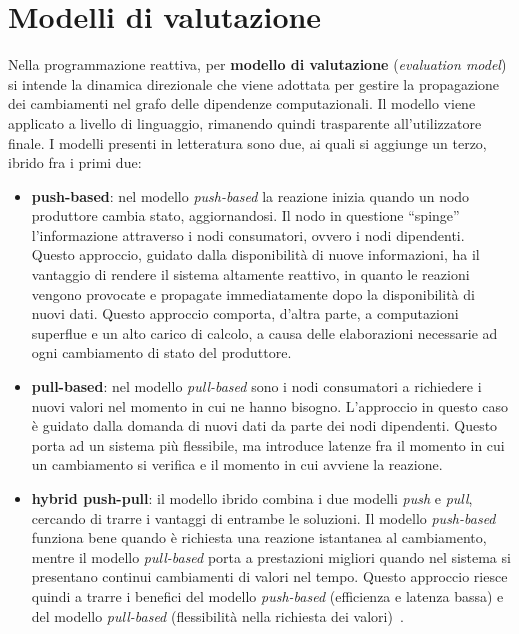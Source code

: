 \documentclass[12pt,a4paper,openright,twoside]{book}
\begin{document}
\section{Modelli di valutazione}
Nella programmazione reattiva, per \textbf{modello di valutazione} (\textit{evaluation model}) si intende la dinamica direzionale che viene adottata per gestire la propagazione dei cambiamenti nel grafo delle dipendenze computazionali. 
Il modello viene applicato a livello di linguaggio, rimanendo quindi trasparente all'utilizzatore finale. 
I modelli presenti in letteratura sono due, ai quali si aggiunge un terzo, ibrido fra i primi due: 
\begin{itemize}
    \item \textbf{push-based}: nel modello \textit{push-based} la reazione inizia quando un nodo produttore cambia stato, aggiornandosi. Il nodo in questione ``spinge'' l'informazione attraverso i nodi consumatori, ovvero i nodi dipendenti. Questo approccio, guidato dalla disponibilità di nuove informazioni, ha il vantaggio di rendere il sistema altamente reattivo, in quanto le reazioni vengono provocate e propagate immediatamente dopo la disponibilità di nuovi dati. Questo approccio comporta, d'altra parte, a computazioni superflue e un alto carico di calcolo, a causa delle elaborazioni necessarie ad ogni cambiamento di stato del produttore. 
    \item \textbf{pull-based}: nel modello \textit{pull-based} sono i nodi consumatori a richiedere i nuovi valori nel momento in cui ne hanno bisogno. L'approccio in questo caso è guidato dalla domanda di nuovi dati da parte dei nodi dipendenti. Questo porta ad un sistema più flessibile, ma introduce latenze fra il momento in cui un cambiamento si verifica e il momento in cui avviene la reazione. 
    \item \textbf{hybrid push-pull}: il modello ibrido combina i due modelli \textit{push} e \textit{pull}, cercando di trarre i vantaggi di entrambe le soluzioni. Il modello \textit{push-based} funziona bene quando è richiesta una reazione istantanea al cambiamento, mentre il modello \textit{pull-based} porta a prestazioni migliori quando nel sistema si presentano continui cambiamenti di valori nel tempo. Questo approccio riesce quindi a trarre i benefici del modello \textit{push-based} (efficienza e latenza bassa) e del modello \textit{pull-based} (flessibilità nella richiesta dei valori)~\cite{DBLP:conf/haskell/Elliott09}.  
\end{itemize}
\end{document}
